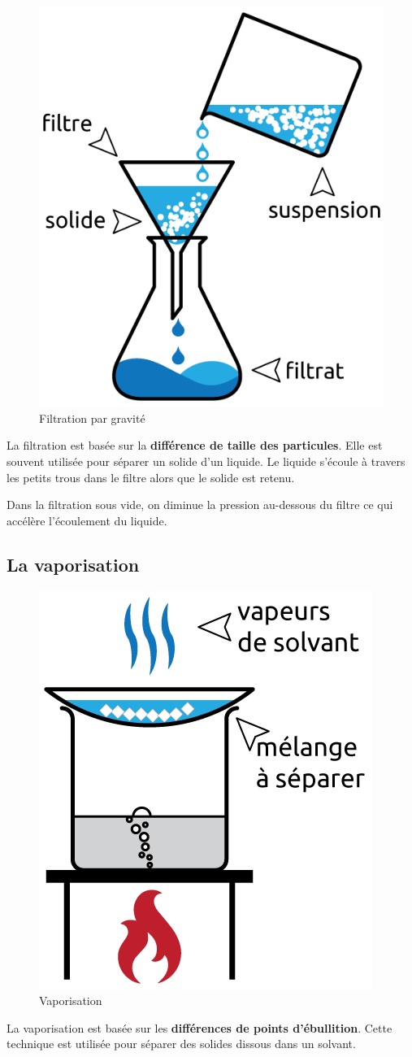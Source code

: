 \documentclass[
  11pt,
  a4paper,
  openany]{book}
\begin{document}
\begin{figure}

{\centering \includegraphics[width=0.28\linewidth]{images/filtration} 

}

\caption{Filtration par gravité}\label{fig:filtration}
\end{figure}

La filtration est basée sur la \textbf{différence de taille des particules}. Elle est souvent utilisée pour séparer un solide d'un liquide. Le liquide s'écoule à travers les petits trous dans le filtre alors que le solide est retenu.

Dans la filtration sous vide, on diminue la pression au-dessous du filtre ce qui accélère l'écoulement du liquide.

\newpage

\hypertarget{la-vaporisation}{%
\subsection{La vaporisation}\label{la-vaporisation}}

\begin{figure}

{\centering \includegraphics[width=0.25\linewidth]{images/evaporation} 

}

\caption{Vaporisation}\label{fig:evaporation}
\end{figure}

La vaporisation est basée sur les \textbf{différences de points d'ébullition}. Cette technique est utilisée pour séparer des solides dissous dans un solvant.
\end{document}

